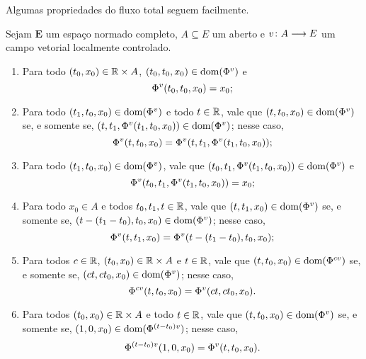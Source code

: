Algumas propriedades do fluxo total seguem facilmente.

\begin{proposition}
\label{prop:fluxo.total.campo.vetorial}
Sejam $\bm E$ um espaço normado completo, $A \subseteq E$ um aberto e $\fun{v}{A}{E}$ um campo vetorial localmente controlado.
	\begin{enumerate}
	\item Para todo $(t_0, x_0) \in \R \times A$, $(t_0, t_0, x_0) \in \dom(\Flux[v])$ e
		\begin{equation*}
		\Flux(t_0, t_0, x_0) = x_0;
		\end{equation*}
	\item Para todo $(t_1, t_0, x_0) \in \dom(\Flux[v])$ e todo $t \in \R$, vale que $(t,t_0,x_0) \in \dom(\Flux[v])$ se, e somente se, $(t, t_1, \Flux(t_1, t_0, x_0)) \in \dom(\Flux[v])$; nesse caso,
		\begin{equation*}
		\Flux(t,t_0,x_0) = \Flux(t, t_1, \Flux(t_1, t_0, x_0));
		\end{equation*}
	\item Para todo $(t_1,t_0, x_0) \in \dom(\Flux[v])$, vale que $(t_0, t_1, \Flux(t_1, t_0, x_0)) \in \dom(\Flux[v])$ e
		\begin{equation*}
		\Flux(t_0, t_1, \Flux(t_1, t_0, x_0)) = x_0;
		\end{equation*}
	\item Para todo $x_0 \in A$ e todos $t_0, t_1, t \in \R$, vale que $(t, t_1, x_0) \in \dom(\Flux[v])$ se, e somente se, $(t-(t_1-t_0), t_0, x_0) \in \dom(\Flux[v])$; nesse caso,
		\begin{equation*}
		\Flux(t, t_1, x_0) = \Flux(t-(t_1-t_0), t_0, x_0);
		\end{equation*}
	\item Para todos $c \in \R$, $(t_0, x_0) \in \R \times A$ e $t \in \R$, vale que $(t, t_0, x_0) \in \dom(\Phi^{cv})$ se, e somente se, $(ct, ct_0, x_0) \in \dom(\Flux[v])$; nesse caso,
		\begin{equation*}
		\Flux[cv](t, t_0, x_0) = \Flux(ct, ct_0, x_0).
		\end{equation*}
	\item Para todos $(t_0, x_0) \in \R \times A$ e todo $t \in \R$, vale que $(t, t_0, x_0) \in \dom(\Flux[v])$ se, e somente se, $(1, 0, x_0) \in \dom(\Flux[(t-t_0)v])$; nesse caso,
		\begin{equation*}
		\Flux[(t-t_0)v](1, 0, x_0) = \Flux[v](t, t_0, x_0).
		\end{equation*}
	\end{enumerate}
\end{proposition}
